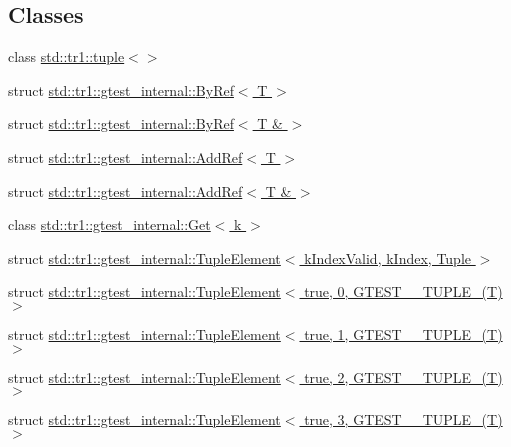 \subsection*{Classes}
\begin{DoxyCompactItemize}
\item 
class \hyperlink{classstd_1_1tr1_1_1tuple}{std\+::tr1\+::tuple$<$$>$}
\item 
struct \hyperlink{structstd_1_1tr1_1_1gtest__internal_1_1_by_ref}{std\+::tr1\+::gtest\+\_\+internal\+::\+By\+Ref$<$ T $>$}
\item 
struct \hyperlink{structstd_1_1tr1_1_1gtest__internal_1_1_by_ref_3_01_t_01_6_01_4}{std\+::tr1\+::gtest\+\_\+internal\+::\+By\+Ref$<$ T \& $>$}
\item 
struct \hyperlink{structstd_1_1tr1_1_1gtest__internal_1_1_add_ref}{std\+::tr1\+::gtest\+\_\+internal\+::\+Add\+Ref$<$ T $>$}
\item 
struct \hyperlink{structstd_1_1tr1_1_1gtest__internal_1_1_add_ref_3_01_t_01_6_01_4}{std\+::tr1\+::gtest\+\_\+internal\+::\+Add\+Ref$<$ T \& $>$}
\item 
class \hyperlink{classstd_1_1tr1_1_1gtest__internal_1_1_get}{std\+::tr1\+::gtest\+\_\+internal\+::\+Get$<$ k $>$}
\item 
struct \hyperlink{structstd_1_1tr1_1_1gtest__internal_1_1_tuple_element}{std\+::tr1\+::gtest\+\_\+internal\+::\+Tuple\+Element$<$ k\+Index\+Valid, k\+Index, Tuple $>$}
\item 
struct \hyperlink{structstd_1_1tr1_1_1gtest__internal_1_1_tuple_element_3_01true_00_010_00_01_g_t_e_s_t__10___t_u_p_l_e___07_t_08_01_4}{std\+::tr1\+::gtest\+\_\+internal\+::\+Tuple\+Element$<$ true, 0, G\+T\+E\+S\+T\+\_\+\_\+\+T\+U\+P\+L\+E\+\_\+(\+T) $>$}
\item 
struct \hyperlink{structstd_1_1tr1_1_1gtest__internal_1_1_tuple_element_3_01true_00_011_00_01_g_t_e_s_t__10___t_u_p_l_e___07_t_08_01_4}{std\+::tr1\+::gtest\+\_\+internal\+::\+Tuple\+Element$<$ true, 1, G\+T\+E\+S\+T\+\_\+\_\+\+T\+U\+P\+L\+E\+\_\+(\+T) $>$}
\item 
struct \hyperlink{structstd_1_1tr1_1_1gtest__internal_1_1_tuple_element_3_01true_00_012_00_01_g_t_e_s_t__10___t_u_p_l_e___07_t_08_01_4}{std\+::tr1\+::gtest\+\_\+internal\+::\+Tuple\+Element$<$ true, 2, G\+T\+E\+S\+T\+\_\+\_\+\+T\+U\+P\+L\+E\+\_\+(\+T) $>$}
\item 
struct \hyperlink{structstd_1_1tr1_1_1gtest__internal_1_1_tuple_element_3_01true_00_013_00_01_g_t_e_s_t__10___t_u_p_l_e___07_t_08_01_4}{std\+::tr1\+::gtest\+\_\+internal\+::\+Tuple\+Element$<$ true, 3, G\+T\+E\+S\+T\+\_\+\_\+\+T\+U\+P\+L\+E\+\_\+(\+T) $>$}

\end{DoxyCompactItemize}

